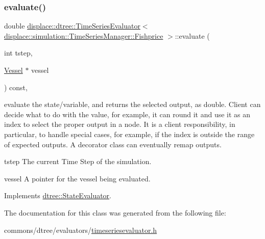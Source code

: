 \subsubsection{\texorpdfstring{evaluate()}{evaluate()}}
{\footnotesize\ttfamily double \mbox{\hyperlink{classdisplace_1_1dtree_1_1_time_series_evaluator}{displace\+::dtree\+::\+Time\+Series\+Evaluator}}$<$ \mbox{\hyperlink{classdisplace_1_1simulation_1_1_time_series_manager_ae4e516e8c6ce2707d48ffafec4613eceafbd6bb29f771353434f015ab47736109}{displace\+::simulation\+::\+Time\+Series\+Manager\+::\+Fishprice}} $>$\+::evaluate (\begin{DoxyParamCaption}\item[{int}]{tstep,  }\item[{\mbox{\hyperlink{class_vessel}{Vessel}} $\ast$}]{vessel }\end{DoxyParamCaption}) const\hspace{0.3cm}{\ttfamily [inline]}, {\ttfamily [virtual]}}



evaluate the state/variable, and returns the selected output, as double. Client can decide what to do with the value, for example, it can round it and use it as an index to select the proper output in a node. It is a client responsibility, in particular, to handle special cases, for example, if the index is outside the range of expected outputs. A decorator class can eventually remap outputs. 

\begin{DoxyItemize}
\item tstep The current Time Step of the simulation. \item vessel A pointer for the vessel being evaluated. \end{DoxyItemize}


Implements \mbox{\hyperlink{classdtree_1_1_state_evaluator_ab57666219fbdc728f40d9d5acd5726cb}{dtree\+::\+State\+Evaluator}}.



The documentation for this class was generated from the following file\+:\begin{DoxyCompactItemize}
\item 
commons/dtree/evaluators/\mbox{\hyperlink{timeseriesevaluator_8h}{timeseriesevaluator.\+h}}\end{DoxyCompactItemize}
